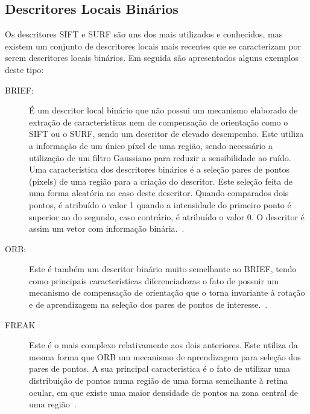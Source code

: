 \subsection{Descritores Locais Binários}

Os descritores SIFT e SURF são uns dos mais utilizados e conhecidos, mas existem um conjunto de descritores locais mais recentes que se caracterizam por serem descritores locais binários. Em seguida são apresentados alguns exemplos deste tipo:

\begin{description}
\item[BRIEF:] É um descritor local binário que não possui um mecanismo elaborado de extração de características nem de compensação de orientação como o SIFT ou o SURF, sendo um descritor de elevado desempenho. Este utiliza a informação de um único píxel de uma região, sendo necessário a utilização de um filtro Gaussiano para reduzir a sensibilidade ao ruído. Uma característica dos descritores binários é a seleção pares de pontos (píxels) de uma região para a criação do descritor. Este seleção feita de uma forma aleatória no caso deste descritor. Quando comparados dois pontos, é atribuído o valor 1 quando a intensidade do primeiro ponto é superior ao do segundo, caso contrário, é atribuído o valor 0. O descritor é assim um vetor com informação binária.~\cite{Calonder2010}.

\item[ORB:] Este é também um descritor binário muito semelhante ao BRIEF, tendo como principais características diferenciadoras o fato de possuir um mecanismo de compensação de orientação que o torna invariante à rotação e de aprendizagem na seleção dos pares de pontos de interesse.~\cite{Rublee2011}.

\item[FREAK] Este é o mais complexo relativamente aos dois anteriores. Este utiliza da mesma forma que ORB um mecanismo de aprendizagem para seleção dos pares de pontos. A sua principal caracteristica é o fato de utilizar uma distribuição de pontos numa região de uma forma semelhante à retina ocular, em que existe uma maior densidade de pontos na zona central de uma região~\cite{Alahi2012}.
 
\end{description}



